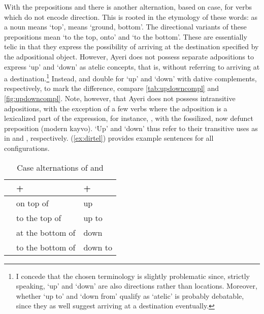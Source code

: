 With the prepositions  and  there is another alternation, based on case, for verbs which do not
encode direction. This is rooted in the etymology of these words:
 as a noun means `top',  means `ground,
bottom'. The directional variants of these prepositions mean `to the top, onto'
and `to the bottom'. These are essentially telic in that they express the
possibility of arriving at the destination specified by the adpositional
object. However, Ayeri does not possess separate adpositions to express `up'
and `down' as atelic concepts, that is, without referring to arriving at a
destination.\footnote{I concede that the chosen terminology is slightly
problematic since, strictly speaking, `up' and `down' are also directions
rather than locations. Moreover, whether `up to' and `down from' qualify as
`atelic' is probably debatable, since they as well suggest arriving at a
destination eventually.} Instead,  and 
double for `up' and `down' with dative complements, respectively, to mark the
difference, compare \autoref{tab:updowncompl} and \autoref{fig:updowncompl}.
Note, however, that Ayeri does not possess intransitive adpositions, with the
exception of a few verbs where the adposition is a lexicalized part of the
expression, for instance, , with
the fossilized, now defunct preposition 
(modern  {kayvo}). `Up' and `down' thus refer to their transitive
uses as in  and , respectively.
(\ref{ex:dirtel}) provides example sentences for all configurations.

\begin{table}\centering
\caption{Case alternations of  and }

\begin{tabu} to \linewidth {X X[c] X[c]}
\toprule\tableheaderfont

%
	& +~\Loc
	& +~\Dat
	\\

\toprule

	& on top of
	& up
	\\


	& to the top of
	& up to
	\\

\midrule

	& at the bottom of
	& down
	\\


	& to the bottom of
	& down to
	\\

\bottomrule
\end{tabu}

\label{tab:updowncompl}
\end{table}

